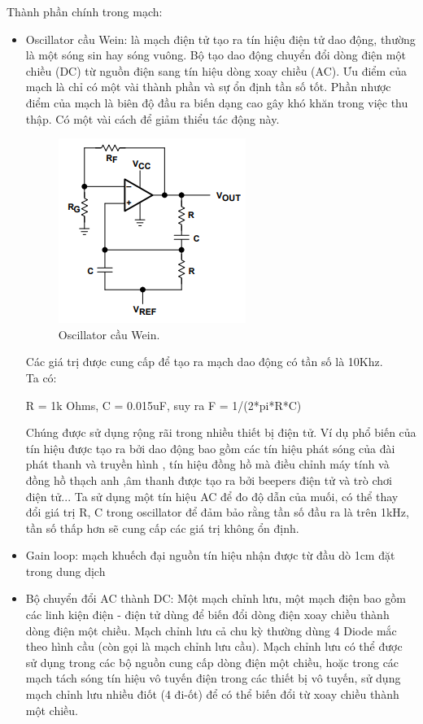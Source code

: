 \documentclass[a4paper,12pt,oneside]{article}
\begin{document}
\noindent Thành phần chính trong mạch:
\begin{itemize}
\item Oscillator cầu Wein: là mạch điện tử tạo ra tín hiệu điện tử dao động, thường là một sóng sin hay sóng vuông. Bộ tạo dao động chuyển đổi dòng điện một chiều (DC) từ nguồn điện sang tín hiệu dòng xoay chiều (AC). Ưu điểm của mạch là chỉ có một vài thành phần và sự ổn định tần số tốt. Phần nhược điểm của mạch là biên độ đầu ra biến dạng cao gây khó khăn trong việc thu thập. Có một vài cách để giảm thiểu tác động này.
\begin{figure}[H]
\centering
\begin{center}
\includegraphics[scale=1]{hinh/PPM/ppm_wein.png}
\end{center}
\caption{Oscillator cầu Wein.}
\end{figure}
Các giá trị được cung cấp để tạo ra mạch dao động có tần số là 10Khz.\\
Ta có:
\begin{center}
R = 1k Ohms, C = 0.015uF, suy ra F = 1/(2*pi*R*C)
\end{center}
Chúng được sử dụng rộng rãi trong nhiều thiết bị điện tử. Ví dụ phổ biến của tín hiệu được tạo ra bởi dao động bao gồm các tín hiệu phát sóng của đài phát thanh và truyền hình , tín hiệu đồng hồ mà điều chỉnh máy tính và đồng hồ thạch anh ,âm thanh được tạo ra bởi beepers điện tử và trò chơi điện tử... Ta sử dụng một tín hiệu AC để đo độ dẫn của muối, có thể thay đổi giá trị R, C trong oscillator để đảm bảo rằng tần số đầu ra là trên 1kHz, tần số thấp hơn sẽ cung cấp các giá trị không ổn định.
\item	Gain loop: mạch khuếch đại nguồn tín hiệu nhận được từ đầu dò 1cm đặt trong dung dịch
\item	Bộ chuyển đổi AC thành DC:  Một mạch chỉnh lưu, một mạch điện bao gồm các linh kiện điện - điện tử dùng để biến đổi dòng điện xoay chiều thành dòng điện một chiều. Mạch chỉnh lưu cả chu kỳ thường dùng 4 Diode mắc theo hình cầu (còn gọi là mạch chỉnh lưu cầu). Mạch chỉnh lưu có thể được sử dụng trong các bộ nguồn cung cấp dòng điện một chiều, hoặc trong các mạch tách sóng tín hiệu vô tuyến điện trong các thiết bị vô tuyến, sử dụng mạch chỉnh lưu nhiều điốt (4 đi-ốt) để có thể biến đổi từ xoay chiều thành một chiều.

\end{itemize}
\end{document}
